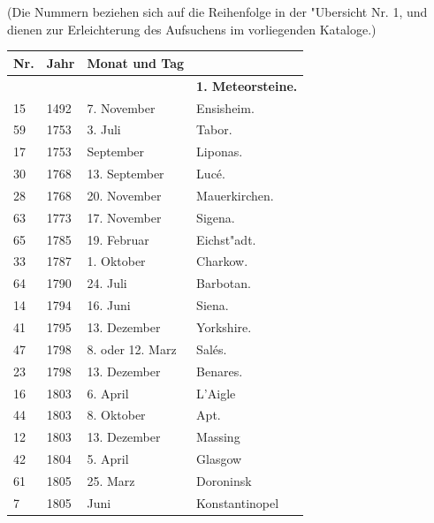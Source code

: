 \documentclass[a4paper, 11pt, oneside, polutonikogreek, german]{article}
\begin{document}
\section{}
\begin{center}

(Die Nummern beziehen sich auf die Reihenfolge in der "Ubersicht Nr. 1, und dienen zur Erleichterung des Aufsuchens im vorliegenden Kataloge.)
\end{center}
\begin{center}
    \footnotesize
    \begin{longtable}{|p{6mm}|p{9mm}|p{60mm}|p{27mm}|}
    \hline
        Nr. & Jahr & Monat und Tag &   \\ \hline
        ~ & ~ & ~ & \textbf{1. Meteorsteine.} \\ \hline
        15 & 1492 & 7. November & Ensisheim. \\ \hline
        59 & 1753 & 3. Juli & Tabor. \\ \hline
        17 & 1753 & September & Liponas. \\ \hline
        30 & 1768 & 13. September & Lucé. \\ \hline
        28 & 1768 & 20. November & Mauerkirchen. \\ \hline
        63 & 1773 & 17. November & Sigena. \\ \hline
        65 & 1785 & 19. Februar & Eichst"adt. \\ \hline
        33 & 1787 & 1. Oktober & Charkow. \\ \hline
        64 & 1790 & 24. Juli & Barbotan. \\ \hline
        14 & 1794 & 16. Juni & Siena. \\ \hline
        41 & 1795 & 13. Dezember & Yorkshire. \\ \hline
        47 & 1798 & 8. oder 12. Marz & Salés. \\ \hline
        23 & 1798 & 13. Dezember & Benares. \\ \hline
        16 & 1803 & 6. April & L’Aigle \\ \hline
        44 & 1803 & 8. Oktober & Apt. \\ \hline
        12 & 1803 & 13. Dezember & Massing \\ \hline
        42 & 1804 & 5. April & Glasgow \\ \hline
        61 & 1805 & 25. Marz & Doroninsk \\ \hline
        7 & 1805 & Juni & Konstantinopel \\ \hline

\end{longtable}
\end{center}
\end{document}

